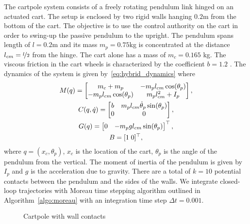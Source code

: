 The cartpole system consists of a freely rotating pendulum link hinged on an
actuated cart.
%
The setup is enclosed by two rigid walls hanging $0.2$m from the bottom of the
cart.
%
The objective is to use the control authority on the cart in order to swing-up
the passive pendulum to the upright.
%
The pendulum spans length of $l=0.2$m and its mass $m_p = 0.75$kg is
concentrated at the distance $l_{cm}=\nicefrac{l}{2}$ from the hinge.
%
The cart alone has a mass of $m_c=0.165$ kg. The viscous friction in the cart
wheels is characterized by the coefficient $b=1.2$ .
%
The dynamics of the system is given by~\eqref{eq:hybrid_dynamics} where 
%
\begin{equation}
    \begin{gathered}
    M(q) = \begin{bmatrix}m_c + m_p & -m_p l_{cm} \cos(\theta_p) \\
        -m_pl_{cm}\cos(\theta_p) & m_p l_{cm}^2+I_p\end{bmatrix}, \\
    C(q, \dot{q}) = \begin{bmatrix}b  & m_pl_{cm}\dot{\theta}_p\sin(\theta_p) \\
        0 & 0\end{bmatrix}, \\
    G(q) = \begin{bmatrix}0 & -m_pg l_{cm} \sin(\theta_p)\end{bmatrix}^\top, \\
        B = [1 \; 0]^\top,
    \end{gathered}
\end{equation}
\noindent where $q = (x_c, \theta_p)$, $x_c$ is the location of the cart,
$\theta_p$ is the angle of the pendulum from the vertical. The moment of inertia
of the pendulum is given by $I_p$ and $g$ is the acceleration due to gravity. 
%
There are a total of $k=10$ potential contacts between the pendulum and the sides of
the walls.
%
We integrate closed-loop trajectories with Moreau time stepping algorithm
outlined in Algorithm~\eqref{algo:moreau} with an integration time step $\Delta
t=0.001$.
%
\begin{figure}[tb]
    \centering
    \caption{Cartpole with wall contacts}
    \label{fig:cartpole_contact}
\end{figure}

